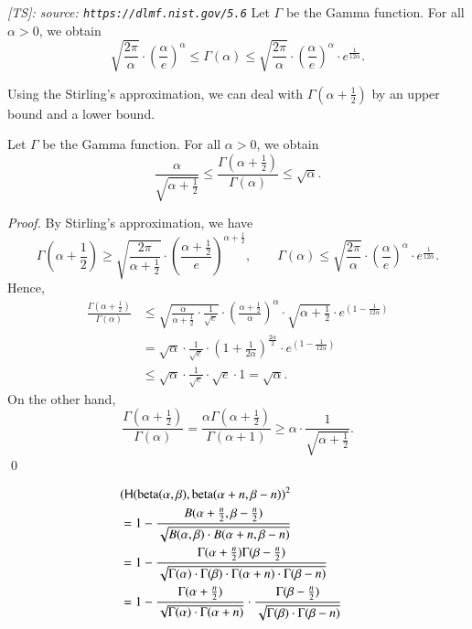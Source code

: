 \documentclass[runningheads,a4paper]{llncs}
\newcommand{\tetsuya}[1]{\ifdraft\textit{\color{deep_green}[TS]: #1}\fi}
\begin{document}
\begin{lemma} \tetsuya{source: {\tt https://dlmf.nist.gov/5.6}}
Let $\Gamma$ be the Gamma function.
For all $\alpha > 0$, we obtain
\[
\sqrt{\frac{2\pi}{\alpha}} \cdot
\left(\frac{\alpha}{e}\right)^\alpha
\leq \Gamma(\alpha) \leq
\sqrt{\frac{2\pi}{\alpha}} \cdot
\left(\frac{\alpha}{e}\right)^\alpha  \cdot e^{\frac{1}{12\alpha}}.
\]
\end{lemma}
Using the Stirling's approximation, we can deal with $\Gamma(\alpha + \frac{1}{2})$ by an upper bound and a lower bound.
\begin{lemma}
Let $\Gamma$ be the Gamma function.
For all $\alpha > 0$, we obtain
\[
\frac{\alpha}{\sqrt{\alpha + \frac{1}{2}}} \leq 
\frac{\Gamma(\alpha + \frac{1}{2})}{\Gamma(\alpha)} \leq \sqrt{\alpha}.
\]
\end{lemma}
\begin{proof}
By Stirling's approximation, we have 
\[
\Gamma(\alpha + \frac{1}{2}) \geq \sqrt{\frac{2\pi}{\alpha + \frac{1}{2}}} \cdot
\left(\frac{\alpha + \frac{1}{2}}{e}\right)^{\alpha + \frac{1}{2}}, \qquad 
\Gamma(\alpha) \leq \sqrt{\frac{2\pi}{\alpha}} \cdot
\left(\frac{\alpha}{e}\right)^\alpha  \cdot e^{\frac{1}{12\alpha}}.
\]
Hence,
\begin{align*}
\frac{\Gamma(\alpha + \frac{1}{2})}{\Gamma(\alpha)}
& \leq \sqrt{ \frac{\alpha}{\alpha + \frac{1}{2}} \cdot \frac{1}{\sqrt{e}}} \cdot  \left(\frac{\alpha + \frac{1}{2}}{\alpha}\right)^\alpha \cdot \sqrt{\alpha + \frac{1}{2}} \cdot e^{(1 - \frac{1}{12\alpha})}\\
&= \sqrt{\alpha} \cdot \frac{1}{\sqrt{e}} \cdot  \left(1 + \frac{1}{2\alpha}\right)^{\frac{2\alpha}{2}} \cdot e^{(1 - \frac{1}{12\alpha})}\\
& \leq \sqrt{\alpha} \cdot \frac{1}{\sqrt{e}} \cdot \sqrt{e} \cdot 1 = \sqrt{\alpha}.
\end{align*}
On the other hand,
\[
\frac{\Gamma(\alpha + \frac{1}{2})}{\Gamma(\alpha)}  = \frac{\alpha \Gamma(\alpha + \frac{1}{2})}{\Gamma(\alpha + 1)} \geq \alpha \cdot \frac{1}{\sqrt{\alpha + \frac{1}{2}}}.
\]
\qed
\end{proof}
\newcommand{\floor}[1]{\lfloor {#1} \rfloor}
\begin{align*}
\lefteqn{
( \hlg(\mathrm{beta}(\alpha,\beta),\mathrm{beta}(\alpha+n,\beta-n))^2
}\\
&= 1 - \frac{B(\alpha+\frac{n}{2},\beta-\frac{n}{2})}{\sqrt{B(\alpha,\beta) \cdot B(\alpha+n,\beta-n)}}\\
&= 1 - \frac{\Gamma(\alpha+\frac{n}{2})\Gamma(\beta-\frac{n}{2})}
{\sqrt{\Gamma(\alpha) \cdot \Gamma(\beta) \cdot \Gamma(\alpha + n ) \cdot \Gamma(\beta - n)}}\\
&= 1 - \frac{\Gamma(\alpha+\frac{n}{2})}{\sqrt{\Gamma(\alpha) \cdot \Gamma(\alpha + n )}} \cdot \frac{\Gamma(\beta-\frac{n}{2})}{\sqrt{\Gamma(\beta) \cdot \Gamma(\beta - n)}}
\end{align*}
\end{document}
